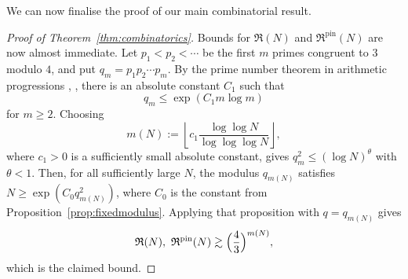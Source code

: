\documentclass[10pt,a4paper]{amsart}
\numberwithin{equation}{section}
\renewcommand{\leq}{\leqslant}
\renewcommand{\le}{\leqslant}
\renewcommand{\geq}{\geqslant}
\begin{document}
We can now finalise the proof of our main combinatorial result.

\begin{proof}[Proof of Theorem~\ref{thm:combinatorics}]
Bounds for $\mathfrak{R}(N)$ and $\mathfrak{R}^{\mathrm{pin}}(N)$ are now almost immediate.
Let $p_1<p_2<\cdots$ be the first $m$ primes congruent to $3$ modulo $4$, and put $q_m=p_1p_2\cdots p_m$. By the prime number theorem in arithmetic progressions \cite[\S20--22]{Davenport}, \cite[\S7.5]{Dujella}, there is an absolute constant $C_1$ such that
\[ q_m\le \exp(C_1m\log m) \]
for $m\geq2$.
Choosing
\[ m(N):=\left\lfloor c_1\frac{\log\log N}{\log\log\log N}\right\rfloor, \]
where $c_1>0$ is a sufficiently small absolute constant, gives $q_m^2 \leq (\log N)^{\theta}$ with $\theta < 1$. Then, for all sufficiently large $N$, the modulus $q_{m(N)}$ satisfies $N\geq \exp(C_0 q_{m(N)}^2)$, where $C_0$ is the constant from Proposition~\ref{prop:fixedmodulus}.
Applying that proposition with $q=q_{m(N)}$ gives
\[ \mathfrak{R}(N),\ \mathfrak{R}^{\mathrm{pin}}(N) \gtrsim \Bigl(\frac{4}{3}\Bigr)^{m(N)}, \]
which is the claimed bound.


\end{proof}
\end{document}
